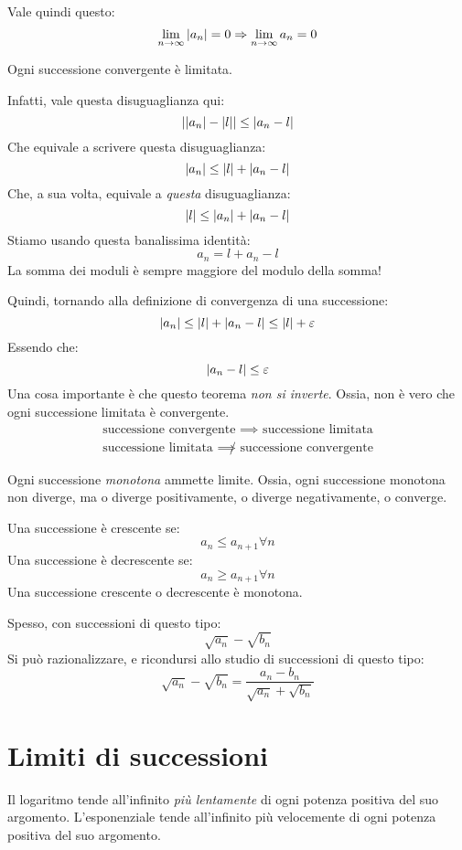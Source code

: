 Vale quindi questo:
\[
\lim_{n \to \infty} \left\lvert{a_n}\right\rvert = 0 \Rightarrow \lim_{n \to \infty} a_n = 0
\]
\begin{theorem}
Ogni successione convergente \`e limitata.
\end{theorem}

Infatti, vale questa disuguaglianza qui:
\[
\left\lvert{\left\lvert{a_n}\right\rvert - \left\lvert{l}\right\rvert}\right\rvert \le \left\lvert{a_n - l}\right\rvert
\]
Che equivale a scrivere questa disuguaglianza:
\[
\left\lvert{a_n}\right\rvert \le \left\lvert{l}\right\rvert + \left\lvert{a_n - l}\right\rvert
\]
Che, a sua volta, equivale a \emph{questa} disuguaglianza:
\[
\left\lvert{l}\right\rvert \le \left\lvert{a_n}\right\rvert + \left\lvert{a_n - l}\right\rvert
\]
Stiamo usando questa banalissima identit\`a:
\[
a_n = l + a_n - l
\]
La somma dei moduli \`e sempre maggiore del modulo della somma!

Quindi, tornando alla definizione di convergenza di una successione:
\[
\left\lvert{a_n}\right\rvert \le \left\lvert{l}\right\rvert + \left\lvert{a_n - l}\right\rvert \le \left\lvert{l}\right\rvert + \varepsilon
\]
Essendo che:
\[
\left\lvert{a_n - l}\right\rvert \le \varepsilon
\]
Una cosa importante \`e che questo teorema \emph{non si inverte}. Ossia, non \`e vero che ogni successione limitata \`e convergente.
\begin{align*}
\text{successione convergente } \implies \text{ successione limitata} \\
\text{successione limitata } \not\implies \text{ successione convergente}
\end{align*}
\begin{theorem}
Ogni successione \emph{monotona} ammette limite. Ossia, ogni successione monotona non diverge, ma o diverge positivamente, o diverge negativamente, o converge.
\end{theorem}

\begin{defn}
Una successione \`e crescente se:
\[
a_n \le a_{n+1} \forall n
\]
Una successione \`e decrescente se:
\[
a_n \ge a_{n+1} \forall n
\]
Una successione crescente o decrescente \`e monotona.
\end{defn}

Spesso, con successioni di questo tipo:
\[
\sqrt{a_n} - \sqrt{b_n}
\]
Si pu\`o razionalizzare, e ricondursi allo studio di successioni di questo tipo:
\[
\sqrt{a_n} - \sqrt{b_n} = \frac{a_n - b_n}{\sqrt{a_n} + \sqrt{b_n}}
\]

\section{Limiti di successioni}

Il logaritmo tende all'infinito \emph{pi\`u lentamente} di ogni potenza positiva del suo argomento. L'esponenziale tende all'infinito pi\`u velocemente di ogni potenza positiva del suo argomento.

